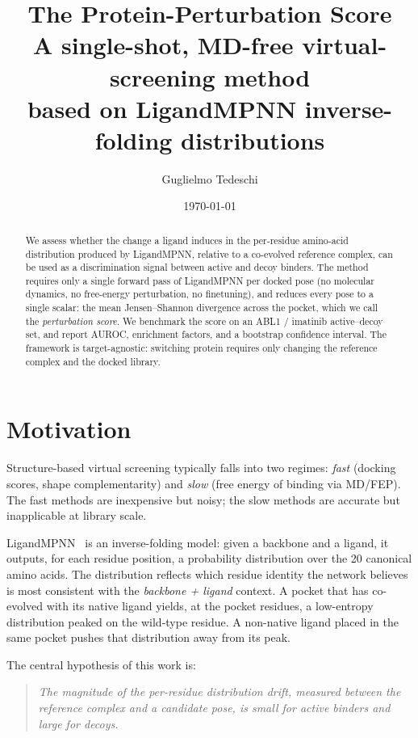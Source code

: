 \documentclass[11pt]{article}
\title{The Protein-Perturbation Score \\
       \large A single-shot, MD-free virtual-screening method \\
       based on LigandMPNN inverse-folding distributions}
\author{Guglielmo Tedeschi}
\date{\today}
\begin{document}
\maketitle

\begin{abstract}
We assess whether the change a ligand induces in the per-residue amino-acid
distribution produced by LigandMPNN, relative to a co-evolved reference
complex, can be used as a discrimination signal between active and decoy
binders. The method requires only a single forward pass of LigandMPNN per
docked pose (no molecular dynamics, no free-energy perturbation, no
finetuning), and reduces every pose to a single scalar: the mean
Jensen--Shannon divergence across the pocket, which we call the
\emph{perturbation score}. We benchmark the score on an ABL1 / imatinib
active--decoy set, and report AUROC, enrichment factors, and a bootstrap
confidence interval. The framework is target-agnostic: switching protein
requires only changing the reference complex and the docked library.
\end{abstract}

\section{Motivation}

Structure-based virtual screening typically falls into two regimes:
\emph{fast} (docking scores, shape complementarity) and \emph{slow} (free
energy of binding via MD/FEP). The fast methods are inexpensive but noisy;
the slow methods are accurate but inapplicable at library scale.

LigandMPNN~\cite{LigandMPNN} is an inverse-folding model: given a backbone
and a ligand, it outputs, for each residue position, a probability
distribution over the 20 canonical amino acids. The distribution reflects
which residue identity the network believes is most consistent with the
\emph{backbone + ligand} context. A pocket that has co-evolved with its
native ligand yields, at the pocket residues, a low-entropy distribution
peaked on the wild-type residue. A non-native ligand placed in the same
pocket pushes that distribution away from its peak.

The central hypothesis of this work is:

\begin{quote}
\emph{The magnitude of the per-residue distribution drift, measured between
the reference complex and a candidate pose, is small for active binders
and large for decoys.}
\end{quote}
\end{document}
